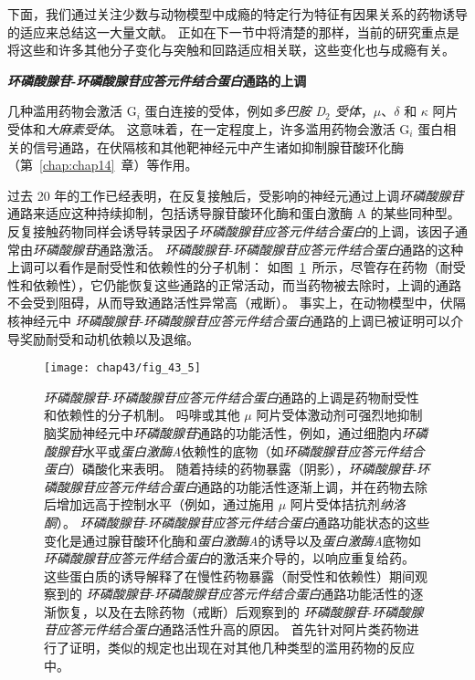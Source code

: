下面，我们通过关注少数与动物模型中成瘾的特定行为特征有因果关系的药物诱导的适应来总结这一大量文献。
正如在下一节中将清楚的那样，当前的研究重点是将这些和许多其他分子变化与突触和回路适应相关联，这些变化也与成瘾有关。


\textbf{\textit{环磷酸腺苷}-\textit{环磷酸腺苷应答元件结合蛋白}通路的上调}

几种滥用药物会激活 G$_i $ 蛋白连接的受体，例如\textit{多巴胺 D$_2$ 受体}，$ \mu $、$ \delta $ 和 $ \kappa $ 阿片受体和\textit{大麻素受体}。
这意味着，在一定程度上，许多滥用药物会激活 G$_i $ 蛋白相关的信号通路，在伏隔核和其他靶神经元中产生诸如抑制腺苷酸环化酶（第~\ref{chap:chap14}~章）等作用。


过去 20 年的工作已经表明，在反复接触后，受影响的神经元通过上调\textit{环磷酸腺苷}通路来适应这种持续抑制，包括诱导腺苷酸环化酶和蛋白激酶 A 的某些同种型。
反复接触药物同样会诱导转录因子\textit{环磷酸腺苷应答元件结合蛋白}​​的上调，该因子通常由\textit{环磷酸腺苷}通路激活。
\textit{环磷酸腺苷}-\textit{环磷酸腺苷应答元件结合蛋白}通路的这种上调可以看作是耐受性和依赖性的分子机制：
如图~\ref{fig:43_5}~所示，尽管存在药物（耐受性和依赖性），它仍能恢复这些通路的正常活动，而当药物被去除时，上调的通路不会受到阻碍，从而导致通路活性异常高（戒断）。
事实上，在动物模型中，伏隔核神经元中 \textit{环磷酸腺苷}-\textit{环磷酸腺苷应答元件结合蛋白}通路的上调已被证明可以介导奖励耐受和动机依赖以及退缩。


\begin{figure}[htbp]
	\centering
	\texttt{[image: chap43/fig\_43\_5]}
	\caption{\textit{环磷酸腺苷}-\textit{环磷酸腺苷应答元件结合蛋白}通路的上调是药物耐受性和依赖性的分子机制。
		吗啡或其他 $\mu$ 阿片受体激动剂可强烈地抑制脑奖励神经元中\textit{环磷酸腺苷}通路的功能活性，例如，通过细胞内\textit{环磷酸腺苷}水平或\textit{蛋白激酶A}依赖性的底物（如\textit{环磷酸腺苷应答元件结合蛋白}）磷酸化来表明。
		随着持续的药物暴露（阴影），\textit{环磷酸腺苷}-\textit{环磷酸腺苷应答元件结合蛋白}通路的功能活性逐渐上调，并在药物去除后增加远高于控制水平（例如，通过施用 $\mu$ 阿片受体拮抗剂\textit{纳洛酮}）。
		\textit{环磷酸腺苷}-\textit{环磷酸腺苷应答元件结合蛋白}通路功能状态的这些变化是通过腺苷酸环化酶和\textit{蛋白激酶A}的诱导以及\textit{蛋白激酶A}底物如\textit{环磷酸腺苷应答元件结合蛋白}的激活来介导的，以响应重复给药。
		这些蛋白质的诱导解释了在慢性药物暴露（耐受性和依赖性）期间观察到的 \textit{环磷酸腺苷}-\textit{环磷酸腺苷应答元件结合蛋白}通路功能活性的逐渐恢复，以及在去除药物（戒断）后观察到的 \textit{环磷酸腺苷}-\textit{环磷酸腺苷应答元件结合蛋白}通路活性升高的原因。
		首先针对阿片类药物进行了证明，类似的规定也出现在对其他几种类型的滥用药物的反应中\cite{trimble2002molecular}。}
	\label{fig:43_5}
\end{figure}


